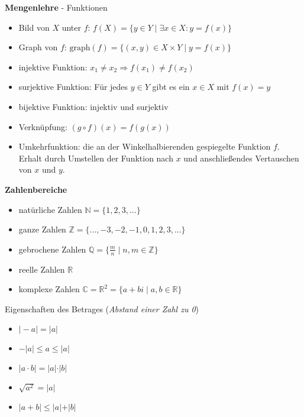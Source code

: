 \documentclass[10pt,landscape,a4paper]{article}
\begin{document}
\begin{multicols*}{4}
\begin{center}
	\normalsize{\textbf{Mengenlehre} - Funktionen} \\
\end{center}
\begin{itemize}
	\item Bild von $X$ unter $f$: $f(X)=\{y\in Y\mid \exists x\in X: y=f(x)\}$
	\item Graph von $f$: $\text{graph}(f)=\{(x,y)\in X\times Y\mid y=f(x)\}$
	\item injektive Funktion: $x_1\neq x_2\Rightarrow f(x_1)\neq f(x_2)$
	\item surjektive Funktion: Für jedes $y\in Y$ gibt es ein $x\in X$ mit $f(x)=y$
	\item bijektive Funktion: injektiv und surjektiv
	\item Verknüpfung: $(g\circ f)(x) = f(g(x))$
	\item Umkehrfunktion: die an der Winkelhalbierenden gespiegelte Funktion $f$. Erhalt durch Umstellen der Funktion nach $x$ und anschließendes Vertauschen von $x$ und $y$.
\end{itemize}

\begin{center}
	\normalsize{\textbf{Zahlenbereiche}} \\
\end{center}
\begin{itemize}
	\item natürliche Zahlen $\mathbb{N} = \{1,2,3,...\}$
	\item ganze Zahlen $\mathbb{Z} = \{...,-3,-2,-1,0,1,2,3,...\}$
	\item gebrochene Zahlen $\mathbb{Q} = \{\frac{m}{n}\mid n,m\in\mathbb{Z}\}$
	\item reelle Zahlen $\mathbb{R}$
	\item komplexe Zahlen $\mathbb{C} = \mathbb{R}^2 = \{a+bi\mid a,b\in\mathbb{R}\}$
\end{itemize}

Eigenschaften des Betrages (\textit{Abstand einer Zahl zu 0})
\begin{itemize}
	\item $\vert -a\vert = \vert a\vert$
	\item $-\vert a\vert\le a\le \vert a\vert$
	\item $\vert a\cdot b\vert = \vert a\vert\cdot\vert b\vert$
	\item $\sqrt{a^2} = \vert a\vert$
	\item $\vert a+b\vert \le \vert a\vert + \vert b\vert$
\end{itemize}


\end{multicols*}
\end{document}
